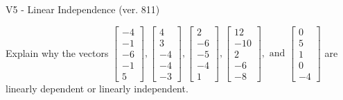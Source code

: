 \begin{exercise}
  \begin{exerciseTitle}V5 - Linear Independence (ver. 811)\end{exerciseTitle}
  \begin{exerciseStatement}
    Explain why the vectors \(\left[\begin{array}{r}
-4 \\
-1 \\
-6 \\
-1 \\
5
\end{array}\right] , \left[\begin{array}{r}
4 \\
3 \\
-4 \\
-4 \\
-3
\end{array}\right] , \left[\begin{array}{r}
2 \\
-6 \\
-5 \\
-4 \\
1
\end{array}\right] , \left[\begin{array}{r}
12 \\
-10 \\
2 \\
-6 \\
-8
\end{array}\right] , \text{ and } \left[\begin{array}{r}
0 \\
5 \\
1 \\
0 \\
-4
\end{array}\right]\) are linearly dependent or linearly independent.	



\end{exerciseStatement}
\end{exercise}
